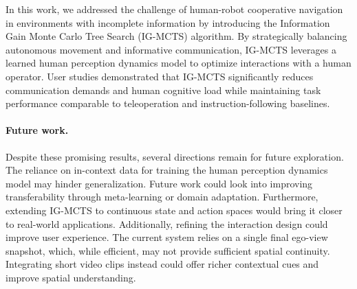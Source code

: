 In this work, we addressed the challenge of human-robot cooperative navigation in environments with incomplete information by introducing the Information Gain Monte Carlo Tree Search (IG-MCTS) algorithm. By strategically balancing autonomous movement and informative communication, IG-MCTS leverages a learned human perception dynamics model to optimize interactions with a human operator. User studies demonstrated that IG-MCTS significantly reduces communication demands and human cognitive load while maintaining task performance comparable to teleoperation and instruction-following baselines.




\paragraph{Future work.}
Despite these promising results, several directions remain for future exploration. The reliance on in-context data for training the human perception dynamics model may hinder generalization. Future work could look into improving transferability through meta-learning or domain adaptation. 
Furthermore, extending IG-MCTS to continuous state and action spaces would bring it closer to real-world applications.
Additionally, refining the interaction design could improve user experience. The current system relies on a single final ego-view snapshot, which, while efficient, may not provide sufficient spatial continuity. Integrating short video clips instead could offer richer contextual cues and improve spatial understanding. 


